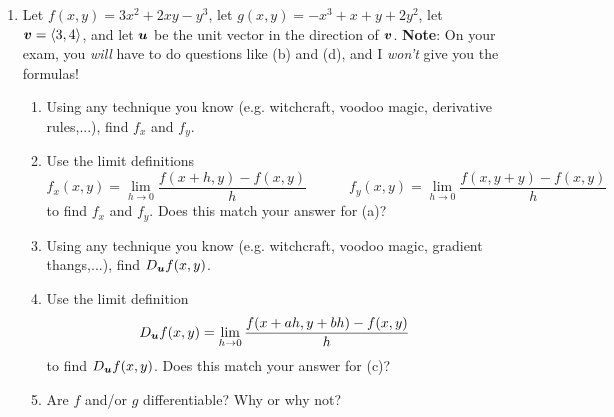 \documentclass[12 pt]{article}
\newcommand{\note}[1]{\textbf{Note}: #1}
\begin{document}
\begin{enumerate}[leftmargin=0in, rightmargin=-0.25in]
	\item Let $f(x,y)=3x^2+2xy-y^3$, let $g(x,y)=-x^3+x+y+2y^2$, let $\boldsymbol{v}=\langle 3,4 \rangle$, and let $\boldsymbol{u}$ be the unit vector in the direction of $\boldsymbol{v}$. \note{On your exam, you \textit{will} have to do questions like (b) and (d), and I \textit{won't} give you the formulas!}
	\begin{enumerate}[itemsep=0.625in]
		\item Using any technique you know (e.g. witchcraft, voodoo magic, derivative rules,...), find $f_x$ and $f_y$.
		\item Use the limit definitions
		$$f_x(x,y)=\lim_{h\to0}\frac{f(x+h,y)-f(x,y)}{h} \quad\quad\quad f_y(x,y)=\lim_{h\to0}\frac{f(x,y+y)-f(x,y)}{h}$$
		to find $f_x$ and $f_y$. Does this match your answer for (a)?
		\item Using any technique you know (e.g. witchcraft, voodoo magic, gradient thangs,...), find $D_{\boldsymbol{u}}f(x,y)$.
		\item Use the limit definition
		$$D_{\boldsymbol{u}}f(x,y)=\lim_{h\to0}\frac{f(x+ah,y+bh)-f(x,y)}{h}$$
		to find $D_{\boldsymbol{u}}f(x,y)$. Does this match your answer for (c)?
		\item Are $f$ and/or $g$ differentiable? Why or why not?
	\end{enumerate}

	\newpage
	


\end{enumerate}
\end{document}
